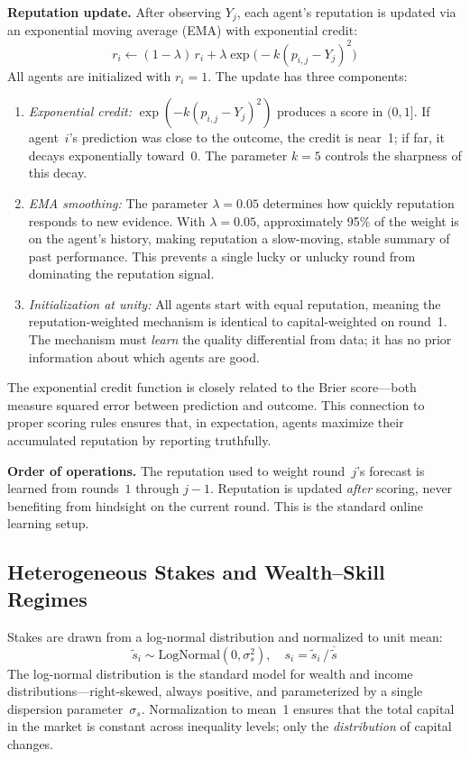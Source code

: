 \documentclass[conference]{IEEEtran}
\begin{document}
\textbf{Reputation update.} After observing $Y_j$, each agent's reputation is updated via an exponential moving average (EMA) with exponential credit:
\begin{equation}
    r_i \leftarrow (1 - \lambda) \, r_i + \lambda \exp\!\big(-k (p_{i,j} - Y_j)^2\big)
\end{equation}%
All agents are initialized with $r_i = 1$. The update has three components:
\begin{enumerate}
    \item \emph{Exponential credit:} $\exp(-k(p_{i,j} - Y_j)^2)$ produces a score in $(0, 1]$. If agent~$i$'s prediction was close to the outcome, the credit is near~1; if far, it decays exponentially toward~0. The parameter $k = 5$ controls the sharpness of this decay.
    \item \emph{EMA smoothing:} The parameter $\lambda = 0.05$ determines how quickly reputation responds to new evidence. With $\lambda = 0.05$, approximately 95\% of the weight is on the agent's history, making reputation a slow-moving, stable summary of past performance. This prevents a single lucky or unlucky round from dominating the reputation signal.
    \item \emph{Initialization at unity:} All agents start with equal reputation, meaning the reputation-weighted mechanism is identical to capital-weighted on round~1. The mechanism must \emph{learn} the quality differential from data; it has no prior information about which agents are good.
\end{enumerate}

The exponential credit function is closely related to the Brier score---both measure squared error between prediction and outcome. This connection to proper scoring rules ensures that, in expectation, agents maximize their accumulated reputation by reporting truthfully.

\textbf{Order of operations.} The reputation used to weight round~$j$'s forecast is learned from rounds~$1$ through $j{-}1$. Reputation is updated \emph{after} scoring, never benefiting from hindsight on the current round. This is the standard online learning setup.

\subsection{Heterogeneous Stakes and Wealth--Skill Regimes}
\label{sec:model-stakes}

Stakes are drawn from a log-normal distribution and normalized to unit mean:
\begin{equation}
    \tilde{s}_i \sim \text{LogNormal}(0, \sigma_s^2), \quad s_i = \tilde{s}_i \, / \, \overline{\tilde{s}}
\end{equation}
The log-normal distribution is the standard model for wealth and income distributions---right-skewed, always positive, and parameterized by a single dispersion parameter~$\sigma_s$. Normalization to mean~1 ensures that the total capital in the market is constant across inequality levels; only the \emph{distribution} of capital changes.
\end{document}

